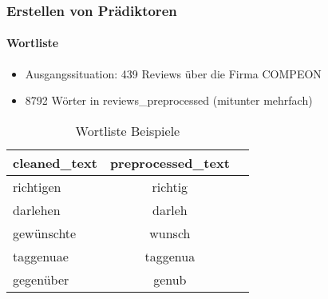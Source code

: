 \begin{frame}
\frametitle{Erstellen von Prädiktoren}
\framesubtitle{Wortliste}
\begin{itemize}
\item Ausgangssituation: 439 Reviews über die Firma COMPEON 
\item 8792 Wörter in reviews\_preprocessed (mitunter mehrfach)
\end{itemize}
\begin{table}
	\centering
		\begin{tabular}[h]{l|c|r}
			cleaned\_text & preprocessed\_text \\
			\hline
			richtigen & richtig \\
			\hline
			darlehen & darleh \\
			\hline
			gewünschte & wunsch \\
			\hline
			taggenuae & taggenua \\
			\hline
			gegenüber & genub
			
			
		\end{tabular}
		\item
	\caption{Wortliste Beispiele}
	\label{tab:WortlisteBeispiele}
\end{table}
\end{frame}